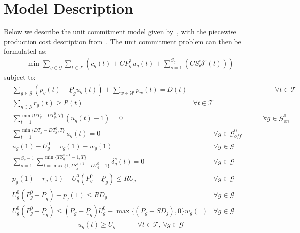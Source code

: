 \documentclass{article}
\newcommand{\cT}{{\mathcal T}}
\newcommand{\cG}{{\mathcal G}}
\newcommand{\cW}{{\mathcal W}}
\newcommand{\uP}{\underline{P}}
\newcommand{\oP}{\overline{P}}
\begin{document}
\section{Model Description}
Below we describe the unit commitment model given by~\cite{morales2013tight}, with the piecewise production cost description from~\cite{sridhar2013locally}.
The unit commitment problem can then be formulated as:
{\allowdisplaybreaks
		\begin{align}
		& \text{min } \sum_{g \in \cG} \sum_{t \in \cT} \left( c_g(t) + CP_g^1 \, u_g(t) + \sum_{s = 1}^{S_g} \left( CS^s_g \delta^s(t) \right) \right) \label{eq:obj} %
		\end{align}
		subject to:
		\begin{align}
		& \sum_{g \in \cG} \left( p_g(t) + \uP_g u_g(t) \right) + \sum_{w\in\cW} p_w(t) = D(t) & \hspace{5cm} \forall t \in \cT \label{eq:UCDemand} \\
		& \sum_{g \in \cG} r_g(t) \geq R(t) &  \forall t \in \cT \label{eq:UCReserves}
		\end{align}
		\begin{align}
		& \sum_{t=1}^{\min\{UT_g - UT_g^0, T\}} (u_g(t) - 1) = 0 & \hspace{3cm} \forall g \in \cG_{\textit{on}}^0 \label{eq:initialUpRequirement} \\
		& \sum_{t=1}^{\min\{DT_g - DT_g^0, T\}} u_g(t) = 0 & \forall g \in \cG_{\textit{off}}^0 \label{eq:initialDownRequirement} \\
		& u_g(1) - U_g^0 = v_g(1) - w_g(1) & \forall g \in \cG \label{eq:LogicalInitial} \\	
		& \sum_{s=1}^{S_g-1} \sum_{t=\max\{1, TS^{s+1}_g - DT^0_g + 1\}}^{\min\{TS^{s+1}_g -1,T\}} \delta^s_g(t) = 0 & \forall g \in \cG \label{eq:STIInit}\\
		& p_g(1) + r_g(1) - U_g^0(P_g^0-\uP_g) \leq RU_g & \forall g \in \cG \label{eq:RampUpInit} \\
		& U_g^0(P_g^0-\uP_g) - p_g(1) \leq RD_g & \forall g \in \cG \label{eq:RampDownInit} \\
		& U_g^0(P_g^0-\uP_g) \leq (\oP_g - \uP_g) U_g^0 - \max\{(\oP_g - SD_g),0\} w_g(1) & \forall g \in \cG \label{eq:MaxOutput2Init}
		\end{align}
		\begin{align}
		& u_g(t) \geq U_g & \hspace{1cm} \forall t \in \cT, \, \forall g \in \cG \label{eq:MustRun} \\

\end{align}}
\end{document}
